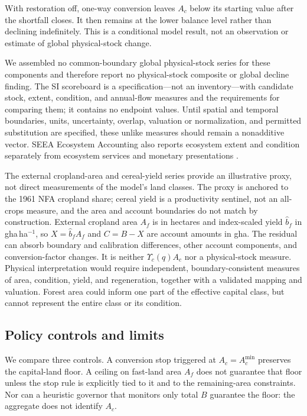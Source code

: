 \documentclass[preprint,12pt,authoryear]{elsarticle}
\newcommand{\Ups}{\Upsilon_c}
\newcommand{\Acmin}{A_c^{\min}}
\begin{document}
With restoration off, one-way conversion leaves $A_c$ below its starting value after the shortfall closes. It then remains at the lower balance level rather than declining indefinitely. This is a conditional model result, not an observation or estimate of global physical-stock change.

We assembled no common-boundary global physical-stock series for these components and therefore report no physical-stock composite or global decline finding. The SI scoreboard is a specification—not an inventory—with candidate stock, extent, condition, and annual-flow measures and the requirements for comparing them; it contains no endpoint values. Until spatial and temporal boundaries, units, uncertainty, overlap, valuation or normalization, and permitted substitution are specified, these unlike measures should remain a nonadditive vector. SEEA Ecosystem Accounting also reports ecosystem extent and condition separately from ecosystem services and monetary presentations \citep{UN2021SEEA_EA}.

The external cropland-area and cereal-yield series provide an illustrative proxy, not direct measurements of the model's land classes. The proxy is anchored to the 1961 NFA cropland share; cereal yield is a productivity sentinel, not an all-crops measure, and the area and account boundaries do not match by construction. External cropland area $A_f$ is in hectares and index-scaled yield $\hat b_f$ in gha\,ha$^{-1}$, so $X=\hat b_fA_f$ and $C=B-X$ are account amounts in gha. The residual can absorb boundary and calibration differences, other account components, and conversion-factor changes. It is neither $\Ups(q)A_c$ nor a physical-stock measure. Physical interpretation would require independent, boundary-consistent measures of area, condition, yield, and regeneration, together with a validated mapping and valuation. Forest area could inform one part of the effective capital class, but cannot represent the entire class or its condition.

\subsection{Policy controls and limits}

We compare three controls. A conversion stop triggered at $A_c=\Acmin$ preserves the capital-land floor. A ceiling on fast-land area $A_f$ does not guarantee that floor unless the stop rule is explicitly tied to it and to the remaining-area constraints. Nor can a heuristic governor that monitors only total $B$ guarantee the floor: the aggregate does not identify $A_c$.
\end{document}
